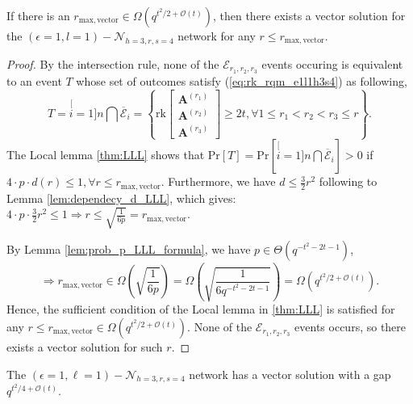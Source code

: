 \begin{thm}
If there is an $r_{\mathrm{max,vector}}\in\Omega\left(q^{t^{2}/2+\mathcal{O}\left(t\right)}\right)$,
then there exists a vector solution for the $\left(\epsilon=1,l=1\right)-\mathcal{N}_{h=3,r,s=4}$
network for any $r\leq r_{\mathrm{max,vector}}$. \label{theo:r_for_vector_sol_e1l1h3rs4}
\end{thm}
\begin{proof}
By the intersection rule, none of the $\mathcal{E}_{r_{1},r_{2},r_{3}}$
events occuring is equivalent to an event $T$ whose set of outcomes
satisfy (\ref{eq:rk_rqm_e1l1h3s4}) as following,
\[
T=\stackrel[i=1]{n}{\bigcap}\overline{\mathcal{E}}_{i}=\left\{ \mathrm{rk}\left[\begin{array}{c}
\boldsymbol{A}^{\left(r_{1}\right)}\\
\boldsymbol{A}^{\left(r_{2}\right)}\\
\boldsymbol{A}^{\left(r_{3}\right)}
\end{array}\right]\geq2t,\forall1\leq r_{1}<r_{2}<r_{3}\leq r\right\} .
\]
The Local lemma \ref{thm:LLL} shows that $\mathrm{Pr}\left[T\right]=\mathrm{Pr}\left[\stackrel[i=1]{n}{\bigcap}\overline{\mathcal{E}}_{i}\right]>0$
if $4\cdot p\cdot d(r)\leq1,\forall r\leq r_{\mathrm{max,vector}}$.
Furthermore, we have $d\leq\frac{3}{2}r^{2}$ following to Lemma \ref{lem:dependecy_d_LLL},
which gives: $4\cdot p\cdot\frac{3}{2}r^{2}\leq1\Rightarrow r\leq\sqrt{\frac{1}{6p}}=r_{\mathrm{max,vector}}$.

By Lemma \ref{lem:prob_p_LLL_formula}, we have $p\in\Theta\left(q^{-t^{2}-2t-1}\right)$,
\[
\Rightarrow r_{\mathrm{max,vector}}\in\Omega\left(\sqrt{\frac{1}{6p}}\right)=\Omega\left(\sqrt{\frac{1}{6q^{-t^{2}-2t-1}}}\right)=\Omega\left(q^{t^{2}/2+\mathcal{O}\left(t\right)}\right).
\]
Hence, the sufficient condition of the Local lemma in \ref{thm:LLL}
is satisfied for any $r\leq r_{\mathrm{max,vector}}\in\Omega\left(q^{t^{2}/2+\mathcal{O}\left(t\right)}\right)$.
None of the $\mathcal{E}_{r_{1},r_{2},r_{3}}$ events occurs, so there
exists a vector solution for such $r$.
\end{proof}
\begin{cor}
The $\left(\epsilon=1,\ell=1\right)-\mathcal{N}_{h=3,r,s=4}$ network
has a vector solution with a gap $q^{t^{2}/4+\mathcal{O}(t)}$.
\end{cor}
